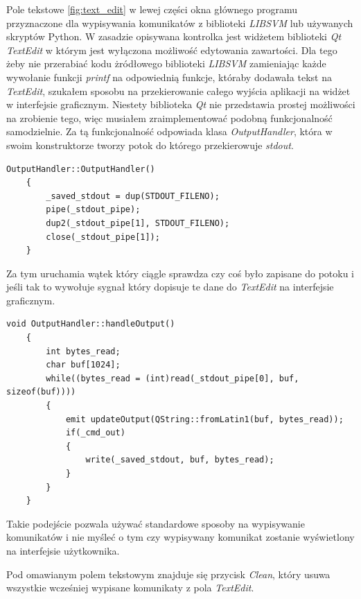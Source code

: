 \documentclass[paper=a4, fontsize=11pt]{scrartcl} %
\numberwithin{equation}{section} %
\numberwithin{figure}{section} %
\begin{document}
    \par Pole tekstowe \ref{fig:text_edit} w lewej części okna głównego programu przyznaczone
    dla wypisywania komunikatów z biblioteki \textit{LIBSVM} lub używanych skryptów Python. W
    zasadzie opisywana kontrolka jest widżetem biblioteki \textit{Qt} \textit{TextEdit} w
    którym jest wyłączona możliwość edytowania zawartości. Dla tego żeby nie przerabiać kodu
    żródłowego biblioteki \textit{LIBSVM} zamieniając każde wywołanie funkcji \textit{printf}
    na odpowiednią funkcje, któraby dodawała tekst na \textit{TextEdit}, szukałem sposobu na
    przekierowanie całego wyjścia aplikacji na widżet w interfejsie graficznym. Niestety
    biblioteka \textit{Qt} nie przedstawia prostej możliwości na zrobienie tego, więc musiałem
    zraimplementować podobną funkcjonalność samodzielnie. Za tą funkcjonalność odpowiada klasa
    \textit{OutputHandler}, która w swoim konstruktorze tworzy potok do którego przekierowuje
    \textit{stdout}.

    \begin{lstlisting}[caption={Konstruktor klasy \textit{OutputHandler}},captionpos=b]
    OutputHandler::OutputHandler()
    {
        _saved_stdout = dup(STDOUT_FILENO);
        pipe(_stdout_pipe);
        dup2(_stdout_pipe[1], STDOUT_FILENO);
        close(_stdout_pipe[1]);
    }
    \end{lstlisting}

    \par Za tym uruchamia wątek który ciągle sprawdza czy coś było zapisane do potoku i jeśli
    tak to wywołuje sygnał który dopisuje te dane do \textit{TextEdit} na interfejsie graficznym.

    \newpage
    \begin{lstlisting}[caption={Funkcja uruchamiana w wątku},captionpos=b]
    void OutputHandler::handleOutput()
    {
        int bytes_read;
        char buf[1024];
        while((bytes_read = (int)read(_stdout_pipe[0], buf, sizeof(buf))))
        {
            emit updateOutput(QString::fromLatin1(buf, bytes_read));
            if(_cmd_out)
            {
                write(_saved_stdout, buf, bytes_read);
            }
        }
    }
    \end{lstlisting}

    \par Takie podejście pozwala używać standardowe sposoby na wypisywanie komunikatów i nie
    myśleć o tym czy wypisywany komunikat zostanie wyświetlony na interfejsie użytkownika.
    \par Pod omawianym polem tekstowym znajduje się przycisk \textit{Clean}, który usuwa
    wszystkie wcześniej wypisane komunikaty z pola \textit{TextEdit}. 
\end{document}
